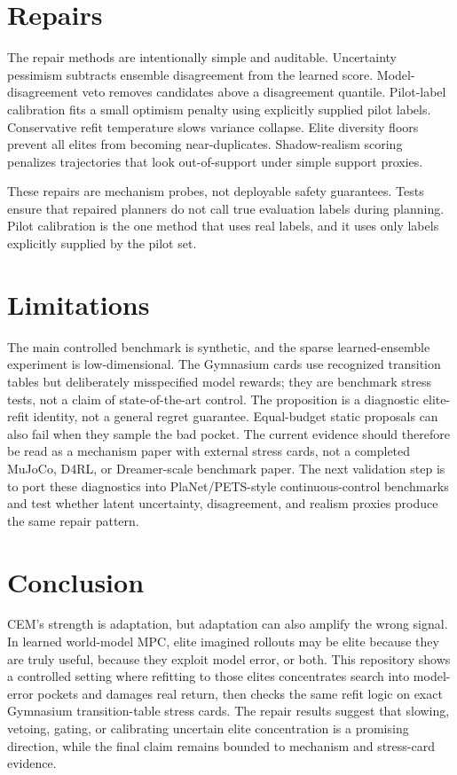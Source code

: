 \documentclass{article}
\begin{document}
\section{Repairs}

The repair methods are intentionally simple and auditable. Uncertainty pessimism subtracts ensemble disagreement from the learned score. Model-disagreement veto removes candidates above a disagreement quantile. Pilot-label calibration fits a small optimism penalty using explicitly supplied pilot labels. Conservative refit temperature slows variance collapse. Elite diversity floors prevent all elites from becoming near-duplicates. Shadow-realism scoring penalizes trajectories that look out-of-support under simple support proxies.

These repairs are mechanism probes, not deployable safety guarantees. Tests ensure that repaired planners do not call true evaluation labels during planning. Pilot calibration is the one method that uses real labels, and it uses only labels explicitly supplied by the pilot set.

\section{Limitations}

The main controlled benchmark is synthetic, and the sparse learned-ensemble
experiment is low-dimensional. The Gymnasium cards use recognized transition
tables but deliberately misspecified model rewards; they are benchmark stress
tests, not a claim of state-of-the-art control. The proposition is a diagnostic
elite-refit identity, not a general regret guarantee. Equal-budget static
proposals can also fail when they sample the bad pocket. The current evidence
should therefore be read as a mechanism paper with external stress cards, not a
completed MuJoCo, D4RL, or Dreamer-scale benchmark paper. The next validation
step is to port these diagnostics into PlaNet/PETS-style continuous-control
benchmarks and test whether latent uncertainty, disagreement, and realism
proxies produce the same repair pattern.

\section{Conclusion}

CEM's strength is adaptation, but adaptation can also amplify the wrong signal.
In learned world-model MPC, elite imagined rollouts may be elite because they
are truly useful, because they exploit model error, or both. This repository
shows a controlled setting where refitting to those elites concentrates search
into model-error pockets and damages real return, then checks the same refit
logic on exact Gymnasium transition-table stress cards. The repair results
suggest that slowing, vetoing, gating, or calibrating uncertain elite
concentration is a promising direction, while the final claim remains bounded
to mechanism and stress-card evidence.
\end{document}
